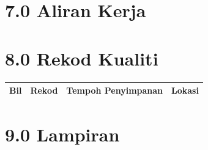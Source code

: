\documentclass[
]{article}
\begin{document}
\hypertarget{aliran-kerja}{%
\section{7.0 Aliran Kerja}\label{aliran-kerja}}

\hypertarget{rekod-kualiti}{%
\section{8.0 Rekod Kualiti}\label{rekod-kualiti}}

\begin{longtable}[]{@{}llll@{}}
\toprule
Bil & Rekod & Tempoh Penyimpanan & Lokasi\tabularnewline
\midrule
\endhead
\bottomrule
\end{longtable}

\hypertarget{lampiran}{%
\section{9.0 Lampiran}\label{lampiran}}
\end{document}
